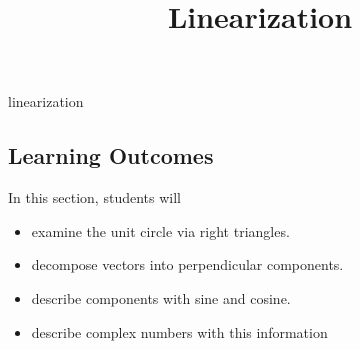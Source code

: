 \documentclass{ximera}
\title{Linearization}
\begin{document}
\begin{abstract}
\end{abstract}
\maketitle


linearization







\subsection{Learning Outcomes}


\begin{sectionOutcomes}
In this section, students will 

\begin{itemize}
\item examine the unit circle via right triangles.
\item decompose vectors into perpendicular components.
\item describe components with sine and cosine.
\item describe complex numbers with this information
\end{itemize}
\end{sectionOutcomes}
\end{document}
